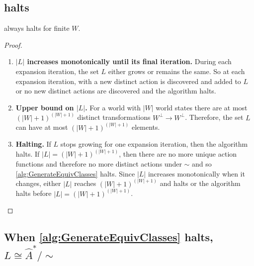 \subsection{ halts}

\begin{proposition}
     always halts for finite $W$.
\end{proposition}
\begin{proof}
\begin{enumerate}
    \item \textbf{$|L|$ increases monotonically until its final iteration.}
    During each expansion iteration, the set $L$ either grows or remains the same.
    So at each expansion iteration, with a new distinct action is discovered and added to $L$ or no new distinct actions are discovered and the algorithm halts.

    \item \textbf{Upper bound on $|L|$.}
    For a world with $|W|$ world states there are at most $(|W| + 1)^{(|W| + 1)}$ distinct transformations $W^{\bot} \to W^{\bot}$.
    Therefore, the set $L$ can have at most $(|W| + 1)^{(|W| + 1)}$ elements.

    \item \textbf{Halting.}
    If $L$ stops growing for one expansion iteration, then the algorithm halts.
    If $|L| = (|W| + 1)^{(|W| + 1)}$, then there are no more unique action functions and therefore no more distinct actions under $\sim$ and so \cref{alg:GenerateEquivClasses} halts.
    Since $|L|$ increases monotonically when it changes, either $|L|$ reaches $(|W| + 1)^{(|W| + 1)}$ and halts or the algorithm halts before $|L| = (|W| + 1)^{(|W| + 1)}$.
\end{enumerate}
\end{proof}

\subsection{When \cref{alg:GenerateEquivClasses} halts, $L \cong \hat{A}^{*}/\sim$}

